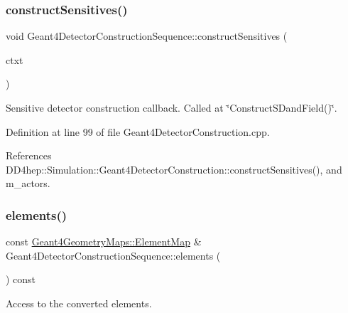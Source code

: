\subsubsection{\texorpdfstring{construct\+Sensitives()}{constructSensitives()}}
{\footnotesize\ttfamily void Geant4\+Detector\+Construction\+Sequence\+::construct\+Sensitives (\begin{DoxyParamCaption}\item[{\hyperlink{class_d_d4hep_1_1_simulation_1_1_geant4_detector_construction_context}{Geant4\+Detector\+Construction\+Context} $\ast$}]{ctxt }\end{DoxyParamCaption})\hspace{0.3cm}{\ttfamily [virtual]}}



Sensitive detector construction callback. Called at \char`\"{}\+Construct\+S\+Dand\+Field()\char`\"{}. 



Definition at line 99 of file Geant4\+Detector\+Construction.\+cpp.



References D\+D4hep\+::\+Simulation\+::\+Geant4\+Detector\+Construction\+::construct\+Sensitives(), and m\+\_\+actors.

\hypertarget{class_d_d4hep_1_1_simulation_1_1_geant4_detector_construction_sequence_aedc109e63a8418c6cfbeab4914f388c2}{}\label{class_d_d4hep_1_1_simulation_1_1_geant4_detector_construction_sequence_aedc109e63a8418c6cfbeab4914f388c2} 
\subsubsection{\texorpdfstring{elements()}{elements()}}
{\footnotesize\ttfamily const \hyperlink{namespace_d_d4hep_1_1_simulation_1_1_geant4_geometry_maps_a175b532b796e7de3d9128c1f0e1ee406}{Geant4\+Geometry\+Maps\+::\+Element\+Map} \& Geant4\+Detector\+Construction\+Sequence\+::elements (\begin{DoxyParamCaption}{ }\end{DoxyParamCaption}) const}



Access to the converted elements. 



